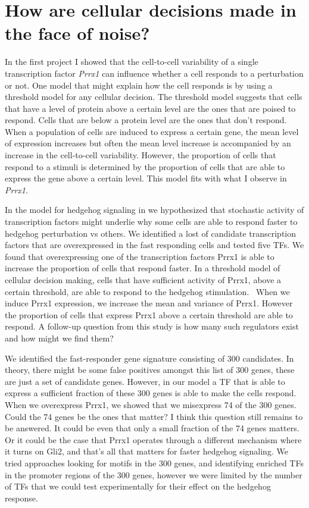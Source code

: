 \section{How are cellular decisions made in the face of noise?}

In the first project I showed that the cell-to-cell variability of a single transcription factor \emph{Prrx1} can influence whether a cell responds to a perturbation or not. One model that might explain how the cell responds is by using a threshold model for any cellular decision. The threshold model suggests that cells that have a level of protein above a certain level are the ones that are poised to respond. Cells that are below a protein level are the ones that don't respond. When a population of cells are induced to express a certain gene, the mean level of expression increases but often the mean level increase is accompanied by an increase in the cell-to-cell variability. However, the proportion of cells that respond to a stimuli is determined by the proportion of cells that are able to express the gene above a certain level. This model fits with what I observe in \emph{Prrx1}.

In the model for hedgehog signaling in \label{Chap:hedgehog} we hypothesized that stochastic activity of transcription factors might underlie why some cells are able to respond faster to hedgehog perturbation vs others. We identified a lost of candidate transcription factors that are overexpressed in the fast responding cells and tested five TFs. We found that overexpressing one of the transcription factors Prrx1 is able to increase the proportion of cells that respond faster. In a threshold model of cellular decision making, cells that have sufficient activity of Prrx1, above a certain threshold, are able to respond to the hedgehog stimulation.  When we induce Prrx1 expression, we increase the mean and variance of Prrx1. However the proportion of cells that express Prrx1 above a certain threshold are able to respond. A follow-up question from this study is how many such regulators exist and how might we find them?

We identified the fast-responder gene signature consisting of 300 candidates. In theory, there might be some false positives amongst this list of 300 genes, these are just a set of candidate genes. However, in our model a TF that is able to express a sufficient fraction of these 300 genes is able to make the cells respond. When we overexpress Prrx1, we showed that we misexpress 74 of the 300 genes. Could the 74 genes be the ones that matter? I think this question still remains to be answered. It could be even that only a small fraction of the 74 genes matters. Or it could be the case that Prrx1 operates through a different mechanism where it turns on Gli2, and that's all that matters for faster hedgehog signaling. We tried approaches looking for motifs in the 300 genes, and identifying enriched TFs in the promoter regions of the 300 genes, however we were limited by the number of TFs that we could test experimentally for their effect on the hedgehog response. 

